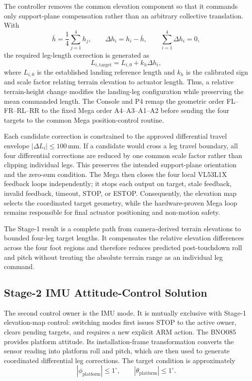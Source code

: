\documentclass{engr1000j-s2}
\begin{document}
The controller removes the common elevation component so that it commands only support-plane compensation rather than an arbitrary collective translation. With
\[
\bar h=\frac{1}{4}\sum_{j=1}^{4}h_j,
\qquad
\Delta h_i=h_i-\bar h,
\qquad
\sum_{i=1}^{4}\Delta h_i=0,
\]
the required leg-length correction is generated as
\[
L_{i,\mathrm{target}}=L_{i,0}+k_h\Delta h_i,
\]
where $L_{i,0}$ is the established landing reference length and $k_h$ is the calibrated sign and scale factor relating terrain elevation to actuator length. Thus, a relative terrain-height change modifies the landing-leg configuration while preserving the mean commanded length. The Console and P4 remap the geometric order FL--FR--RL--RR to the fixed Mega order A4--A3--A1--A2 before sending the four targets to the common Mega position-control routine.

Each candidate correction is constrained to the approved differential travel envelope $|\Delta L_i|\leq100\,\mathrm{mm}$. If a candidate would cross a leg travel boundary, all four differential corrections are reduced by one common scale factor rather than clipping individual legs. This preserves the intended support-plane orientation and the zero-sum condition. The Mega then closes the four local VL53L1X feedback loops independently; it stops each output on target, stale feedback, invalid feedback, timeout, STOP, or ESTOP. Consequently, the elevation map selects the coordinated target geometry, while the hardware-proven Mega loop remains responsible for final actuator positioning and non-motion safety.

The Stage-1 result is a complete path from camera-derived terrain elevations to bounded four-leg target lengths. It compensates the relative elevation differences across the four foot regions and therefore reduces predicted post-touchdown roll and pitch without treating the absolute terrain range as an individual leg command.

\subsection*{Stage-2 IMU Attitude-Control Solution}

The second control owner is the IMU mode. It is mutually exclusive with Stage-1 elevation-map control: switching modes first issues STOP to the active owner, clears pending targets, and requires a new explicit ARM action. The BNO085 provides platform attitude. Its installation-frame transformation converts the sensor reading into platform roll and pitch, which are then used to generate coordinated differential leg corrections. The target condition is approximately
\[
|\phi_{\mathrm{platform}}|\leq1^\circ,
\qquad
|\theta_{\mathrm{platform}}|\leq1^\circ.
\]
\end{document}
